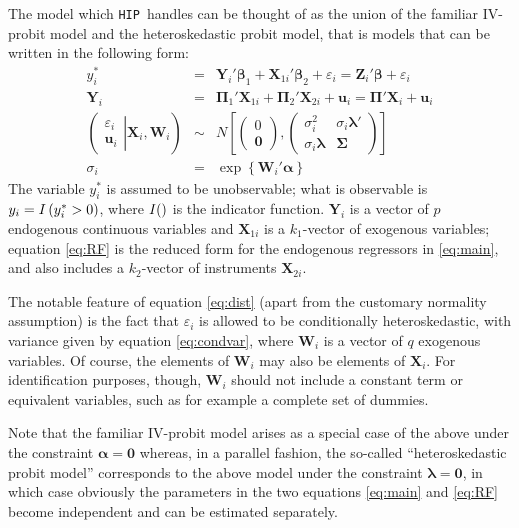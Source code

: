 \documentclass[a4paper,10pt]{article}
\newcommand{\Indic}{\ensuremath I}
\newcommand{\HIP}{\texttt{HIP}}
\newcommand{\Depvar}{y_{i}}
\newcommand{\Latent}{y_{i}^{\ast}}
\newcommand{\Endog}{\mathbf{Y}_{i}}
\newcommand{\Exog}{\mathbf{X}_{1i}}
\newcommand{\Expla}{\mathbf{Z}_{i}}
\newcommand{\Inst}{\mathbf{X}_{2i}}
\newcommand{\ExoInst}{\mathbf{X}_{i}}
\newcommand{\CSReg}{\mathbf{W}_{i}}
\newcommand{\Dist}{\varepsilon_i}
\newcommand{\RfDist}{\mathbf{u}_i}
\newcommand{\ProbitPar}{\bm{\beta}}
\newcommand{\ExoPar}{\ProbitPar_2}
\newcommand{\EndoPar}{\ProbitPar_1}
\newcommand{\RfPar}{\bm{\Pi}}
\newcommand{\VarPar}{\bm{\alpha}}
\newcommand{\CondSig}{\sigma_i}
\newcommand{\Covars}{\bm{\lambda}}
\newcommand{\RfVar}{\bm{\Sigma}}
\begin{document}
The model which \HIP\ handles can be thought of as the union of the
familiar IV-probit model and the heteroskedastic probit model, that is
models that can be written in the following form:
\begin{eqnarray}
\label{eq:main}
\Latent & = & \Endog'\EndoPar + \Exog'\ExoPar + \Dist =
\Expla'\ProbitPar + \Dist \\ 
\label{eq:RF}
\Endog & = & \RfPar_1' \Exog +  \RfPar_2' \Inst + \RfDist = 
\RfPar' \ExoInst + \RfDist \\
\label{eq:dist}
\left( \left.
\begin{array}{cc} \Dist \\ \RfDist \end{array} 
\right| \ExoInst, \CSReg \right) 
& \sim &
N  \left[ 
  \left( \begin{array}{cc} 0 \\ \mathbf{0} \end{array} \right) , 
  \left( \begin{array}{cc}
      \CondSig^2  & \CondSig \Covars' \\
      \CondSig \Covars & \RfVar
    \end{array} \right)
\right] \\
\label{eq:condvar}
\CondSig & = & \exp \left\{ \CSReg'\VarPar \right\}
\end{eqnarray}
The variable $\Latent$ is assumed to be unobservable; what is
observable is $\Depvar = \Indic \left(\Latent > 0\right)$, where
$\Indic()$ is the indicator function. $\Endog$ is a vector of $p$
endogenous continuous variables and $\Exog$ is a $k_1$-vector of
exogenous variables; equation \eqref{eq:RF} is the reduced form for
the endogenous regressors in \eqref{eq:main}, and also includes a
$k_2$-vector of instruments $\Inst$.

The notable feature of equation \eqref{eq:dist} (apart from the
customary normality assumption) is the fact that $\Dist$ is allowed to
be conditionally heteroskedastic, with variance given by equation
\eqref{eq:condvar}, where $\CSReg$ is a vector of $q$ exogenous
variables. Of course, the elements of $\CSReg$ may also be elements of
$\ExoInst$. For identification purposes, though, $\CSReg$ should not
include a constant term or equivalent variables, such as for example a
complete set of dummies.

Note that the familiar IV-probit model arises as a special case of the
above under the constraint $\VarPar = \mathbf{0}$ whereas, in a
parallel fashion, the so-called ``heteroskedastic probit model''
corresponds to the above model under the constraint $\Covars =
\mathbf{0}$, in which case obviously the parameters in the two
equations \eqref{eq:main} and \eqref{eq:RF} become independent and can
be estimated separately.
\end{document}
